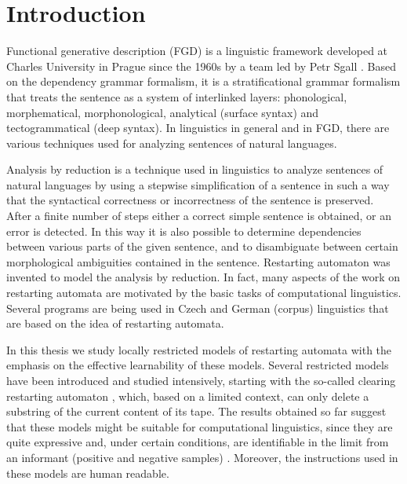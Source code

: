 \chapter*{Introduction}

\let\thefootnote\relax{}

Functional generative description (FGD) is a linguistic framework developed at Charles University in Prague since the 1960s by a team led by Petr Sgall \citep{SgNeGoHa69}. Based on the dependency grammar formalism, it is a stratificational grammar formalism that treats the sentence as a system of interlinked layers: phonological, morphematical, morphonological, analytical (surface syntax) and tectogrammatical (deep syntax). In linguistics in general and in FGD, there are various techniques used for analyzing sentences of natural languages.

Analysis by reduction \citep{LoPlKu05} is a technique used in linguistics to analyze sentences of natural languages by using a stepwise simplification of a sentence in such a way that the syntactical correctness or incorrectness of the sentence is preserved. After a finite number of steps either a correct simple sentence is obtained, or an error is detected. In this way it is also possible to determine dependencies between various parts of the given sentence, and to disambiguate between certain morphological ambiguities contained in the sentence. Restarting automaton \citep{JMPV95,O06} was invented to model the analysis by reduction. In fact, many aspects of the work on restarting automata are motivated by the basic tasks of computational linguistics. Several programs are being used in Czech and German (corpus) linguistics that are based on the idea of restarting automata.

In this thesis we study locally restricted models of restarting automata with the emphasis on the effective learnability of these models. Several restricted models have been introduced and studied intensively, starting with the so-called clearing restarting automaton \citep{CM10}, which, based on a limited context, can only delete a substring of the current content of its tape. The results obtained so far suggest that these models might be suitable for computational linguistics, since they are quite expressive and, under certain conditions, are identifiable in the limit from an informant (positive and negative samples) \citep{C12,C13}. Moreover, the instructions used in these models are human readable.

